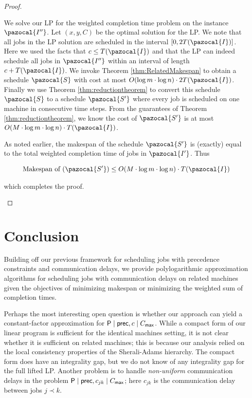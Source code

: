 \begin{proof}
\begin{itemize}
  We solve our LP for the weighted completion time problem on the instance $\pazocal{I''}$.
  Let $(x,y,C)$ be the optimal solution for the LP.
  We note that all jobs in the LP solution are scheduled in the interval $[0, 2T(\pazocal{I})]$.
  Here we used the facts that $c \leq T(\pazocal{I})$ and that the LP can indeed schedule all jobs in $\pazocal{I''}$ within an interval of length $c + T(\pazocal{I})$.
  We invoke Theorem \ref{thm:RelatedMakespan} to obtain a schedule $\pazocal{S}$ with  cost at most $O(\log m \cdot \log n) \cdot 2T(\pazocal{I})$.
  Finally we use Theorem \ref{thm:reductiontheorem} to convert this schedule $\pazocal{S}$ to a schedule  $\pazocal{S'}$ where every job is scheduled on one machine in consecutive time steps. From the guarantees of Theorem \ref{thm:reductiontheorem}, we know the cost of  $\pazocal{S'}$ is at most  $O(M \cdot \log m \cdot \log n) \cdot T(\pazocal{I})$.
  
  As noted earlier, the makespan of the schedule $\pazocal{S'}$ is (exactly) equal to the total weighted completion time of jobs in $\pazocal{I'}$. Thus
  
  $$
  \textrm{Makespan of $(\pazocal{S'})$}  \leq O(M \cdot \log m \cdot \log n ) \cdot T(\pazocal{I})
  $$
  
  which completes the proof.
  
  \end{itemize}
  
  \end{proof}
  
  \section{Conclusion}
  Building off our previous framework for scheduling jobs with precedence constraints and communication delays, 
  we provide polylogarithmic approximation algorithms for scheduling jobs with communication delays on related machines
  given the objectives of minimizing makespan or minimizing the weighted sum of completion times.

Perhaps the most interesting open question is whether our approach can yield a constant-factor approximation for $\mathsf{P} \mid \mathsf{prec}, c \mid C_{\mathsf{max}}$.
While a compact form of our linear program is sufficient for the identical machines setting, 
it is not clear whether it is sufficient on related machines; this is because our analysis relied on the local consistency properties of the Sherali-Adams
hierarchy. The compact form does have an integrality gap, but we do not know of any integrality gap for the full lifted LP.
 Another problem is to handle {\em non-uniform} communication delays in 
 the problem $\mathsf{P} \mid \mathsf{prec}, c_{jk} \mid C_{\mathsf{max}}$; here $c_{jk}$ is the communication delay between jobs $j \prec k$.
  
